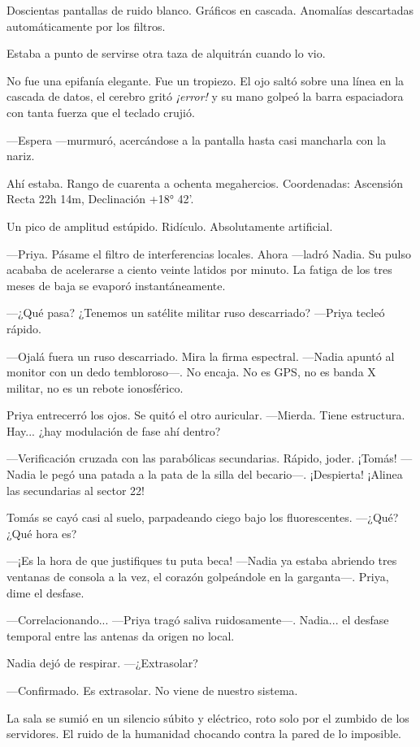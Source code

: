 \documentclass[11pt,a5paper,twoside]{book}
\begin{document}
Doscientas pantallas de ruido blanco. Gráficos en cascada. Anomalías descartadas automáticamente por los filtros.

Estaba a punto de servirse otra taza de alquitrán cuando lo vio.

No fue una epifanía elegante. Fue un tropiezo. El ojo saltó sobre una línea en la cascada de datos, el cerebro gritó \textit{¡error!} y su mano golpeó la barra espaciadora con tanta fuerza que el teclado crujió.

—Espera —murmuró, acercándose a la pantalla hasta casi mancharla con la nariz.

Ahí estaba. Rango de cuarenta a ochenta megahercios. Coordenadas: Ascensión Recta 22h 14m, Declinación +18° 42'.

Un pico de amplitud estúpido. Ridículo. Absolutamente artificial.

—Priya. Pásame el filtro de interferencias locales. Ahora —ladró Nadia. Su pulso acababa de acelerarse a ciento veinte latidos por minuto. La fatiga de los tres meses de baja se evaporó instantáneamente.

—¿Qué pasa? ¿Tenemos un satélite militar ruso descarriado? —Priya tecleó rápido.

—Ojalá fuera un ruso descarriado. Mira la firma espectral. —Nadia apuntó al monitor con un dedo tembloroso—. No encaja. No es GPS, no es banda X militar, no es un rebote ionosférico.

Priya entrecerró los ojos. Se quitó el otro auricular.
—Mierda. Tiene estructura. Hay... ¿hay modulación de fase ahí dentro?

—Verificación cruzada con las parabólicas secundarias. Rápido, joder. ¡Tomás! —Nadia le pegó una patada a la pata de la silla del becario—. ¡Despierta! ¡Alinea las secundarias al sector 22!

Tomás se cayó casi al suelo, parpadeando ciego bajo los fluorescentes.
—¿Qué? ¿Qué hora es?

—¡Es la hora de que justifiques tu puta beca! —Nadia ya estaba abriendo tres ventanas de consola a la vez, el corazón golpeándole en la garganta—. Priya, dime el desfase.

—Correlacionando... —Priya tragó saliva ruidosamente—. Nadia... el desfase temporal entre las antenas da origen no local.

Nadia dejó de respirar.
—¿Extrasolar?

—Confirmado. Es extrasolar. No viene de nuestro sistema.

La sala se sumió en un silencio súbito y eléctrico, roto solo por el zumbido de los servidores. El ruido de la humanidad chocando contra la pared de lo imposible.
\end{document}
